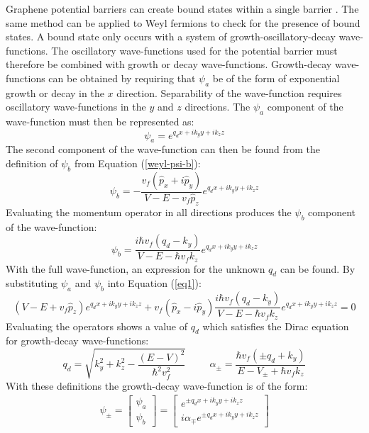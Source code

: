 			Graphene potential barriers can create bound states within a single barrier \cite{b3}. The same method can be applied to Weyl fermions to check for the presence of bound states. A bound state only occurs with a system of growth-oscillatory-decay wave-functions. The oscillatory wave-functions used for the potential barrier must therefore be combined with growth or decay wave-functions. Growth-decay wave-functions can be obtained by requiring that $\psi_{a}$ be of the form of exponential growth or decay in the $x$ direction. Separability of the wave-function requires oscillatory wave-functions in the $y$ and $z$ directions. The $\psi_{a}$ component of the wave-function must then be represented as:
			\begin{equation}
				\psi_{a}=e^{q_{d}x+ik_{y}y+ik_{z}z}
			\end{equation}
			The second component of the wave-function can then be found from the definition of $\psi_{b}$ from Equation (\ref{weyl-psi-b}):
			\begin{equation}
				\psi_{b}= -\frac{v_{f}\left(\hat{p}_{x}+i\hat{p}_{y}\right)}{V-E-v_{f}\hat{p}_{z}}e^{q_{d}x+ik_{y}y+ik_{z}z}
			\end{equation}
			Evaluating the momentum operator in all directions produces the $\psi_{b}$ component of the wave-function:
			\begin{equation}
				\psi_{b}= \frac{i\hbar v_{f}\left(q_{d}-k_{y}\right)}{V-E-\hbar v_{f}k_{z}}e^{q_{d}x+ik_{y}y+ik_{z}z}
			\end{equation}
			With the full wave-function, an expression for the unknown $q_{d}$ can be found. By substituting $\psi_{a}$ and $\psi_{b}$ into Equation (\ref{eq1}):
			\begin{equation}
				\left(V-E+v_{f}\hat{p}_{z}\right)e^{q_{d}x+ik_{y}y+ik_{z}z}+v_{f}\left(\hat{p}_{x}-i\hat{p}_{y}\right)\frac{i\hbar v_{f}\left(q_{d}-k_{y}\right)}{V-E-\hbar v_{f}k_{z}}e^{q_{d}x+ik_{y}y+ik_{z}z}=0
			\end{equation}
			Evaluating the operators shows a value of $q_{d}$ which satisfies the Dirac equation for growth-decay wave-functions:
			\begin{equation}
				q_{d}=\sqrt{k_{y}^{2}+k_{z}^{2}-\frac{\left(E-V\right)^{2}}{\hbar^{2}v_{f}^{2}}}
				\hspace{1cm}
				\alpha_{\pm}=\frac{\hbar v_{f}\left(\pm q_{d}+ k_{y}\right)}{E-V_{\pm}+\hbar v_{f}k_{z}}
			\end{equation}
			With these definitions the growth-decay wave-function is of the form:
			\begin{align}
				\psi_{\pm}=
				\left[\begin{array}{ccc}
					\psi_a\\	
					\psi_b
				\end{array}\right]
				=
				\left[\begin{array}{ccc}
					e^{\pm q_{d}x+ik_{y}y+ik_{z}z}\\	
					i\alpha_{\mp} e^{\pm q_{d}x+ik_{y}y+ik_{z}z}
				\end{array}\right]
			\end{align}
